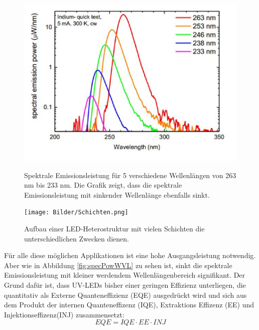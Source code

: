\begin{figure}[htb]
    \centering
    \begin{minipage}[t]{0.49\linewidth}
        \centering
        \includegraphics[width=\linewidth]{Bilder/SpectralEmissionPower_Wavelength.png}
        \caption{Spektrale Emissionsleistung für 5 verschiedene Wellenlängen von 263 nm bis 233 nm. Die Grafik zeigt, dass die spektrale Emissionsleistung mit sinkender Wellenlänge ebenfalls sinkt\cite{semreich}.}
        \label{fig:specPowWVL}
    \end{minipage}
    \hfill
    \begin{minipage}[t]{0.49\linewidth}
        \centering
        \texttt{[image: Bilder/Schichten.png]}
        \caption{Aufbau einer LED-Heterostruktur mit vielen Schichten die unterschiedlichen Zwecken dienen.}
        \label{fig:schichtenLED}
    \end{minipage}
\end{figure}
\noindent
%
Für alle diese möglichen Applikationen ist eine hohe Ausgangsleistung notwendig. Aber wie in Abbildung \ref{fig:specPowWVL} zu sehen ist, sinkt die spektrale Emissionsleistung mit kleiner werdendem Wellenlängenbereich signifikant. Der Grund dafür ist, dass UV-LEDs bisher einer geringen Effizienz unterliegen, die quantitativ als Externe Quanteneffizienz (EQE) ausgedrückt wird und sich aus dem Produkt der internen Quanteneffizenz (IQE), Extraktions Effizenz (EE) und Injektionseffizenz(INJ) zusammensetzt:
%
\begin{equation}
    EQE = IQE \cdot EE \cdot INJ
\end{equation}
%
